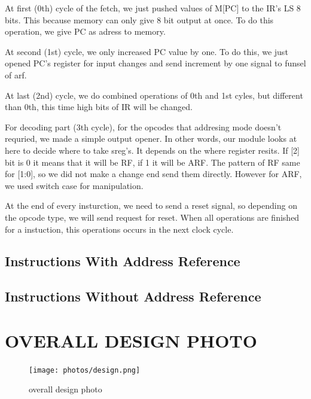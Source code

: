 \documentclass[pdftex,12pt,a4paper]{article}
\begin{document}
At first (0th) cycle of the fetch, we just pushed values of M[PC] to the IR's LS 8 bits.
This because memory can only give 8 bit output at once. To do this operation, we give PC
as adress to memory.

At second (1st) cycle, we only increased PC value by one. To do this, we just opened PC's
register for input changes and send increment by one signal to funsel of arf.

At last (2nd) cycle, we do combined operations of 0th and 1st cyles, but different than 0th,
this time high bits of IR will be changed.



For decoding part (3th cycle), for the opcodes that addresing mode doesn't requried, we made a simple output opener.
In other words, our module looks at here to decide where to take sreg's. It depends on the where register resits. If [2] bit
is 0 it means that it will be RF, if 1 it will be ARF. The pattern of RF same for [1:0], so we did not
make a change end send them directly. However for ARF, we used switch case for manipulation.


At the end of every insturction, we need to send a reset signal, so depending 
on the opcode type, we will send request for reset. When all operations are finished 
for a instuction, this operations occurs in the next clock cycle.






\subsection{Instructions With Address Reference}

\subsection{Instructions Without Address Reference}






\section{OVERALL DESIGN PHOTO}


\begin{figure}[H]
    \centering
    \texttt{[image: photos/design.png]}	
    \caption{overall design photo}
    \label{implementation}
\end{figure}
\end{document}

